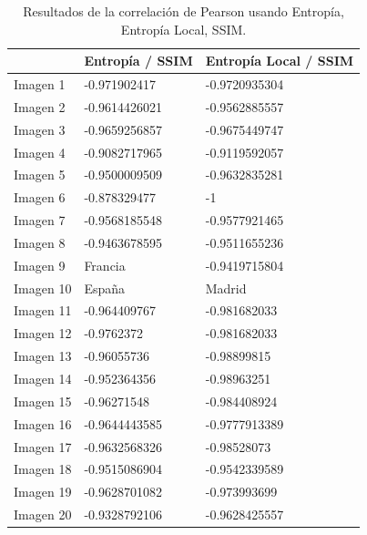 \documentclass[spanish,twocolumn]{article}
\begin{document}
{\begin{table}[htbp]
\begin{center}
\begin{tabular}{|l|l|l|}
\hline
& Entropía / SSIM & Entropía Local / SSIM\\
\hline \hline
Imagen 1 & -0.971902417 & -0.9720935304 \\ \hline
Imagen 2 & -0.9614426021 & -0.9562885557 \\ \hline
Imagen 3 & -0.9659256857 & -0.9675449747 \\ \hline
Imagen 4 & -0.9082717965 & -0.9119592057 \\ \hline
Imagen 5 & -0.9500009509 & -0.9632835281 \\ \hline
Imagen 6 & -0.878329477 & -1 \\ \hline
Imagen 7 & -0.9568185548 & -0.9577921465 \\ \hline
Imagen 8 & -0.9463678595 & -0.9511655236 \\ \hline
Imagen 9 & Francia & -0.9419715804 \\ \hline
Imagen 10 & España & Madrid \\ \hline
Imagen 11 & -0.964409767 & -0.981682033 \\ \hline
Imagen 12 & -0.9762372 & -0.981682033 \\ \hline
Imagen 13 & -0.96055736 & -0.98899815 \\ \hline
Imagen 14 & -0.952364356 & -0.98963251 \\ \hline
Imagen 15 & -0.96271548 & -0.984408924 \\ \hline
Imagen 16 & -0.9644443585 & -0.9777913389 \\ \hline
Imagen 17 & -0.9632568326 & -0.98528073 \\ \hline
Imagen 18 & -0.9515086904 & -0.9542339589 \\ \hline
Imagen 19 & -0.9628701082 & -0.973993699 \\ \hline
Imagen 20 & -0.9328792106 & -0.9628425557 \\ \hline
\end{tabular}
\caption{Resultados de la correlación de Pearson usando Entropía, Entropía Local, SSIM.}
\label{tabla:correlacionSSIM}
\end{center}
\end{table}

}
\end{document}

